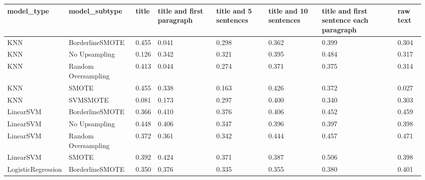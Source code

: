 \begin{tabular}{llllllll}
\toprule
                  model\_type &       model\_subtype & title & title and first paragraph & title and 5 sentences & title and 10 sentences & title and first sentence each paragraph & raw text \\
\midrule
                         KNN &     BorderlineSMOTE & 0.455 &                     0.041 &                 0.298 &                  0.362 &                                   0.399 &    0.304 \\
                         KNN &       No Upsampling & 0.126 &                     0.342 &                 0.321 &                  0.395 &                                   0.484 &    0.317 \\
                         KNN & Random Oversampling & 0.413 &                     0.044 &                 0.274 &                  0.371 &                                   0.375 &    0.314 \\
                         KNN &               SMOTE & 0.455 &                     0.338 &                 0.163 &                  0.426 &                                   0.372 &    0.027 \\
                         KNN &            SVMSMOTE & 0.081 &                     0.173 &                 0.297 &                  0.400 &                                   0.340 &    0.303 \\
                   LinearSVM &     BorderlineSMOTE & 0.366 &                     0.410 &                 0.376 &                  0.406 &                                   0.452 &    0.459 \\
                   LinearSVM &       No Upsampling & 0.448 &                     0.406 &                 0.347 &                  0.396 &                                   0.397 &    0.398 \\
                   LinearSVM & Random Oversampling & 0.372 &                     0.361 &                 0.342 &                  0.444 &                                   0.457 &    0.471 \\
                   LinearSVM &               SMOTE & 0.392 &                     0.424 &                 0.371 &                  0.387 &                                   0.506 &    0.398 \\
          LogisticRegression &     BorderlineSMOTE & 0.350 &                     0.376 &                 0.335 &                  0.355 &                                   0.380 &    0.401 \\

\end{tabular}
